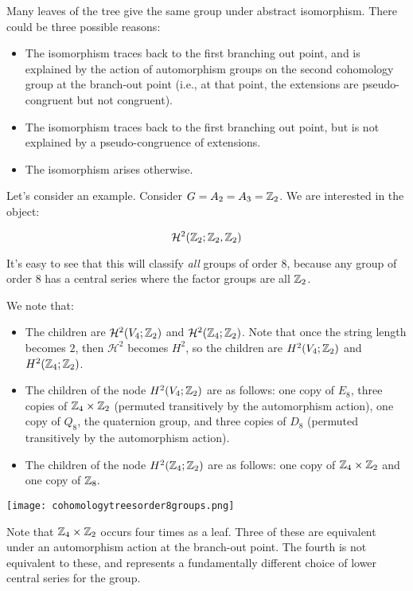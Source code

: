 \documentclass[10pt]{amsart}
\begin{document}
Many leaves of the tree give the same group under abstract
isomorphism. There could be three possible reasons:

\begin{itemize}
\item The isomorphism traces back to the first branching out point,
  and is explained by the action of automorphism groups on the second
  cohomology group at the branch-out point (i.e., at that point, the
  extensions are pseudo-congruent but not congruent).
\item The isomorphism traces back to the first branching out point,
  but is not explained by a pseudo-congruence of extensions.
\item The isomorphism arises otherwise.
\end{itemize}

Let's consider an example. Consider $G = A_2 = A_3 = \mathbb{Z}_2$. We are
interested in the object:

$$\mathcal{H}^2(\mathbb{Z}_2;\mathbb{Z}_2,\mathbb{Z}_2)$$

It's easy to see that this will classify {\em all} groups of order 8,
because any group of order 8 has a central series where the factor
groups are all $\mathbb{Z}_2$.

We note that:

\begin{itemize}
\item The children are $\mathcal{H}^2(V_4;\mathbb{Z}_2)$ and
  $\mathcal{H}^2(\mathbb{Z}_4;\mathbb{Z}_2)$. Note that once the string length becomes
  $2$, then $\mathcal{H}^2$ becomes $H^2$, so the children are
  $H^2(V_4;\mathbb{Z}_2)$ and $H^2(\mathbb{Z}_4;\mathbb{Z}_2)$.
\item The children of the node $H^2(V_4;\mathbb{Z}_2)$ are as follows: one
  copy of $E_8$, three copies of $\mathbb{Z}_4 \times \mathbb{Z}_2$ (permuted
  transitively by the automorphism action), one copy of $Q_8$, the
  quaternion group, and three copies of $D_8$ (permuted transitively
  by the automorphism action).
\item The children of the node $H^2(\mathbb{Z}_4;\mathbb{Z}_2)$ are as follows: one
  copy of $\mathbb{Z}_4 \times \mathbb{Z}_2$ and one copy of $\mathbb{Z}_8.$
\end{itemize}

\texttt{[image: cohomologytreesorder8groups.png]}

Note that $\mathbb{Z}_4 \times \mathbb{Z}_2$ occurs four times as a leaf. Three of
these are equivalent under an automorphism action at the branch-out
point. The fourth is not equivalent to these, and represents a
fundamentally different choice of lower central series for the group.
\end{document}
